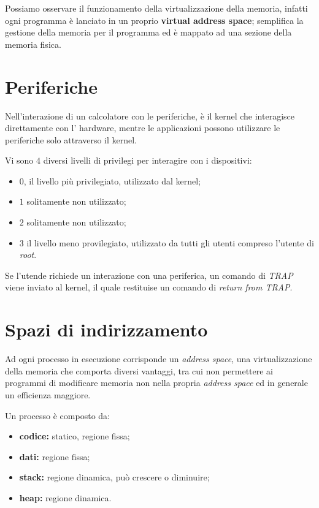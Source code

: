 Possiamo osservare il funzionamento della virtualizzazione della memoria,
infatti ogni programma è lanciato in un proprio \textbf{virtual address space};
semplifica la gestione della memoria per il programma ed è mappato ad una
sezione della memoria fisica.

\section{Periferiche}
Nell'interazione di un calcolatore con le periferiche, è il kernel che
interagisce direttamente con l' hardware, mentre le applicazioni possono
utilizzare le periferiche solo attraverso il kernel.


Vi sono $4$ diversi livelli di privilegi per interagire con i dispositivi:
\begin{itemize}
  \item $0$, il livello più privilegiato, utilizzato dal kernel;
  \item $1$ solitamente non utilizzato;
  \item $2$ solitamente non utilizzato;
  \item $3$ il livello meno provilegiato, utilizzato da tutti gli utenti
    compreso l'utente di \emph{root}.
\end{itemize}

Se l'utende richiede un interazione con una periferica, un comando di
\emph{TRAP} viene inviato al kernel, il quale restituise un comando di
\emph{return from TRAP}.

\section{Spazi di indirizzamento}
Ad ogni processo in esecuzione corrisponde un \emph{address space}, una
virtualizzazione della memoria che comporta diversi vantaggi, tra cui non
permettere ai programmi di modificare memoria non nella propria \emph{address
space} ed in generale un efficienza maggiore.


Un processo è composto da:
\begin{itemize}
  \item \textbf{codice:} statico, regione fissa;
  \item \textbf{dati:} regione fissa;
  \item \textbf{stack:} regione dinamica, può crescere o diminuire;
  \item \textbf{heap:} regione dinamica.
\end{itemize}


